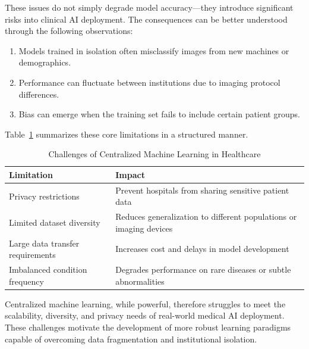 These issues do not simply degrade model accuracy—they introduce significant risks into clinical AI deployment. The consequences can be better understood through the following observations:

\begin{enumerate}
	\item Models trained in isolation often misclassify images from new machines or demographics.
	\item Performance can fluctuate between institutions due to imaging protocol differences.
	\item Bias can emerge when the training set fails to include certain patient groups.
\end{enumerate}

Table~\ref{tab:centralization_challenges} summarizes these core limitations in a structured manner.

\vspace{0.3cm}

\begin{table}[h!]
	\centering
	\renewcommand{\arraystretch}{1.3}
	\setlength{\tabcolsep}{10pt}
	
	\caption{\small Challenges of Centralized Machine Learning in Healthcare}
	\label{tab:centralization_challenges}
	
	
	\begin{tabular}{|p{5cm} | p{8cm}|}
		\hline
		{\textbf{Limitation}} &
		{\textbf{Impact}} \\
		\hline
		
		Privacy restrictions &
		Prevent hospitals from sharing sensitive patient data \\
		\hline
		Limited dataset diversity &
		Reduces generalization to different populations or imaging devices \\
		\hline
		Large data transfer requirements &
		Increases cost and delays in model development \\
		\hline
		Imbalanced condition frequency &
		Degrades performance on rare diseases or subtle abnormalities \\
		\hline
	\end{tabular}
\end{table}

Centralized machine learning, while powerful, therefore struggles to meet the scalability, diversity, and privacy needs of real-world medical AI deployment. These challenges motivate the development of more robust learning paradigms capable of overcoming data fragmentation and institutional isolation.

